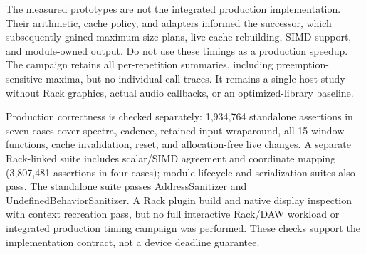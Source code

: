 The measured prototypes are not the integrated production implementation.
Their arithmetic, cache policy, and adapters informed the successor, which
subsequently gained maximum-size plans, live cache rebuilding, SIMD support,
and module-owned output. Do not use these timings as a production speedup.
The campaign retains all per-repetition summaries, including preemption-sensitive
maxima, but no individual call traces. It remains a single-host study without
Rack graphics, actual audio callbacks, or an optimized-library baseline.

Production correctness is checked separately: 1,934,764 standalone assertions
in seven cases cover spectra, cadence, retained-input wraparound, all 15 window
functions, cache invalidation, reset, and allocation-free live changes. A
separate Rack-linked suite includes scalar/SIMD agreement and coordinate
mapping (3,807,481 assertions in four cases); module lifecycle and serialization
suites also pass. The standalone suite passes AddressSanitizer and
UndefinedBehaviorSanitizer. A Rack plugin build and native display inspection
with context recreation pass, but no full interactive Rack/DAW workload or
integrated production timing campaign was performed. These checks support the
implementation contract, not a device deadline guarantee.


